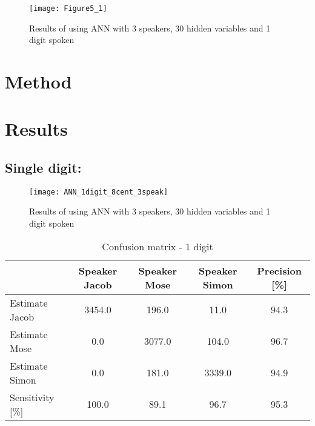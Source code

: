 \begin{figure}[H]
\centering
\texttt{[image: Figure5\_1]}
\caption{Results of using ANN with 3 speakers, 30 hidden variables and 1 digit spoken} 
\label{fig:ANN_fig_theory}
\end{figure}

\section{Method}



\section{Results}


\subsection{Single digit:}
\begin{figure}[H]
\centering
\texttt{[image: ANN\_1digit\_8cent\_3speak]}
\caption{Results of using ANN with 3 speakers, 30 hidden variables and 1 digit spoken}
\label{fig:ANN_fig_1}
\end{figure}

\begin{table}[H]                                                    
\centering                                                          
\begin{tabular}{|l|c|c|c|c|}                                        
\hline                                                              
  & Speaker Jacob & Speaker Mose & Speaker Simon & Precision [\%] \\
\hline                                                              
Estimate Jacob & 3454.0 & 196.0 & 11.0 & 94.3 \\                    
\hline                                                              
Estimate Mose & 0.0 & 3077.0 & 104.0 & 96.7 \\                      
\hline                                                              
Estimate Simon & 0.0 & 181.0 & 3339.0 & 94.9 \\                     
\hline                                                              
Sensitivity [\%] & 100.0 & 89.1 & 96.7 & 95.3 \\                    
\hline                                                              
\end{tabular}                                                       
\caption{Confusion matrix - 1 digit}                                
\label{table:ANN_conf_1}                                            
\end{table}  



